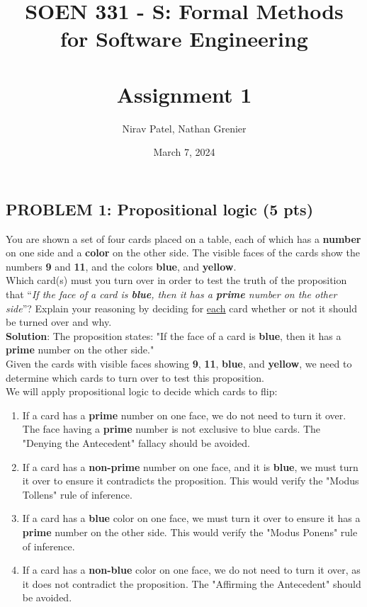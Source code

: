 \documentclass[12pt]{article}
\title{SOEN 331 - S: Formal Methods\\for Software Engineering\\
\ \\
Assignment 1}
\author{Nirav Patel, Nathan Grenier}
\date{March 7, 2024}
\begin{document}
\begin{spacing}{1.5}
	\maketitle
	\thispagestyle{empty}
							    
	\newpage
							    
							    
	\section*{PROBLEM 1: Propositional logic (5 pts)}
												
	You are shown a set of four cards placed on a table, each of which has a \textbf{number} on one
	side and a \textbf{color} on the other side. The visible faces of the cards show the numbers \textbf{9} and
	\textbf{11}, and the colors \textbf{blue}, and \textbf{yellow}.\\
												
	Which card(s) must you turn over in order to test the truth of the proposition that “\textit{If
		the face of a card is \textbf{blue}, then it has a \textbf{prime} number on the other side}”? Explain your
	reasoning by deciding for \uline{each} card whether or not it should be turned over and why.\\
												
	\textbf{Solution}: The proposition states: "If the face of a card is \textbf{blue}, then it has a \textbf{prime} number on the other side."\\
												
	Given the cards with visible faces showing \textbf{9}, \textbf{11}, \textbf{blue}, and \textbf{yellow}, we need to determine which cards to turn over to test this proposition.\\
												
	We will apply propositional logic to decide which cards to flip:
												
	\begin{enumerate}
		\item If a card has a \textbf{prime} number on one face, we do not need to turn it over. The face having a \textbf{prime} number is not exclusive to blue cards. The "Denying the Antecedent" fallacy should be avoided.
		\item If a card has a \textbf{non-prime} number on one face, and it is \textbf{blue}, we must turn it over to ensure it contradicts the proposition. This would verify the "Modus Tollens" rule of inference.
		\item If a card has a \textbf{blue} color on one face, we must turn it over to ensure it has a \textbf{prime} number on the other side. This would verify the "Modus Ponens" rule of inference.
		\item If a card has a \textbf{non-blue} color on one face, we do not need to turn it over, as it does not contradict the proposition. The "Affirming the Antecedent" should be avoided. \\
	\end{enumerate}
												

\end{spacing}
\end{document}
